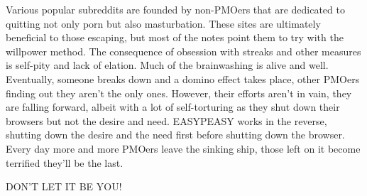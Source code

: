 \documentclass[easypeasy.tex]{subfiles}
\begin{document}
Various popular subreddits are founded by non-PMOers that are dedicated to quitting not only porn but also masturbation. These sites are ultimately beneficial to those escaping, but most of the notes point them to try with the willpower method. The consequence of obsession with streaks and other measures is self-pity and lack of elation. Much of the brainwashing is alive and well. Eventually, someone breaks down and a domino effect takes place, other PMOers finding out they aren't the only ones. However, their efforts aren't in vain, they are falling forward, albeit with a lot of self-torturing as they shut down their browsers but not the desire and need. EASYPEASY works in the reverse, shutting down the desire and the need first before shutting down the browser. Every day more and more PMOers leave the sinking ship, those left on it become terrified they'll be the last.

{\huge DON'T LET IT BE YOU!}
\end{document}
